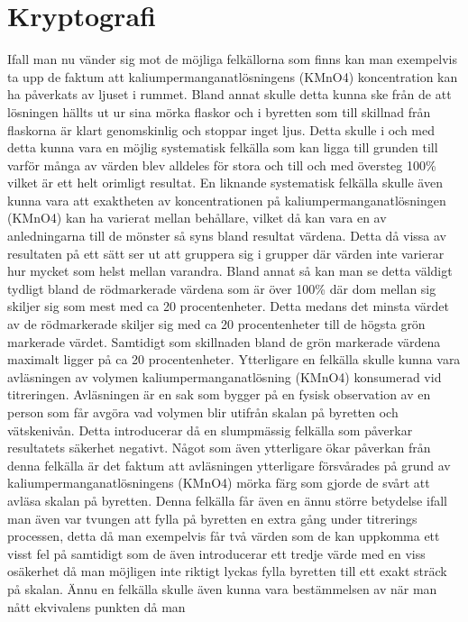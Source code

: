 
\section{Kryptografi}
Ifall man nu vänder sig mot de möjliga felkällorna som finns kan man exempelvis ta upp de faktum
att kaliumpermanganatlösningens (KMnO4) koncentration kan ha påverkats av ljuset i rummet.
Bland annat skulle detta kunna ske från de att lösningen hällts ut ur sina mörka flaskor och i byretten
som till skillnad från flaskorna är klart genomskinlig och stoppar inget ljus. Detta skulle i och med
detta kunna vara en möjlig systematisk felkälla som kan ligga till grunden till varför många av
värden blev alldeles för stora och till och med översteg 100\% vilket är ett helt orimligt resultat.
En liknande systematisk felkälla skulle även kunna vara att exaktheten av koncentrationen på
kaliumpermanganatlösningen (KMnO4) kan ha varierat mellan behållare, vilket då kan vara en av
anledningarna till de mönster så syns bland resultat värdena. Detta då vissa av resultaten på ett sätt
ser ut att gruppera sig i grupper där värden inte varierar hur mycket som helst mellan varandra.
Bland annat så kan man se detta väldigt tydligt bland de rödmarkerade värdena som är över 100\%
där dom mellan sig skiljer sig som mest med ca 20 procentenheter. Detta medans det minsta värdet
av de rödmarkerade skiljer sig med ca 20 procentenheter till de högsta grön markerade värdet.
Samtidigt som skillnaden bland de grön markerade värdena maximalt ligger på ca 20 procentenheter.
Ytterligare en felkälla skulle kunna vara avläsningen av volymen kaliumpermanganatlösning
(KMnO4) konsumerad vid titreringen. Avläsningen är en sak som bygger på en fysisk observation av
en person som får avgöra vad volymen blir utifrån skalan på byretten och vätskenivån. Detta
introducerar då en slumpmässig felkälla som påverkar resultatets säkerhet negativt. Något som även
ytterligare ökar påverkan från denna felkälla är det faktum att avläsningen ytterligare försvårades på
grund av kaliumpermanganatlösningens (KMnO4) mörka färg som gjorde de svårt att avläsa skalan
på byretten. Denna felkälla får även en ännu större betydelse ifall man även var tvungen att fylla på
byretten en extra gång under titrerings processen, detta då man exempelvis får två värden som de kan
uppkomma ett visst fel på samtidigt som de även introducerar ett tredje värde med en viss osäkerhet
då man möjligen inte riktigt lyckas fylla byretten till ett exakt sträck på skalan.
Ännu en felkälla skulle även kunna vara bestämmelsen av när man nått ekvivalens punkten då man
